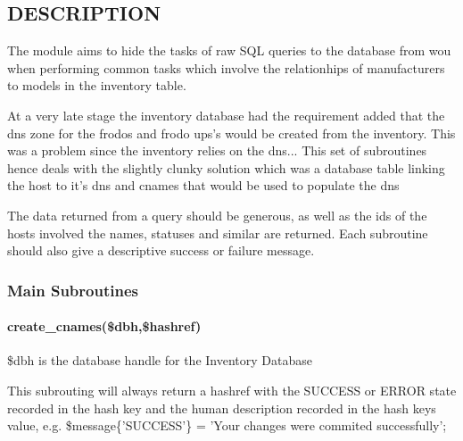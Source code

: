 \documentclass{book}
\begin{document}
\subsection{DESCRIPTION}
\label{Inventory::Cnames_DESCRIPTION}
\hypertarget{Inventory::Cnames_DESCRIPTION}{}



The module aims to hide the tasks of raw SQL queries to the database from wou when performing common tasks which involve the relationhips of manufacturers to models in the inventory table.



At a very late stage the inventory database had the requirement added that the dns zone for the frodos and frodo ups's would be created from the inventory. This was a problem since the inventory relies on the dns... This set of subroutines hence deals with the slightly clunky solution which was a database table linking the host to it's dns and cnames that would be used to populate the dns



The data returned from a query should be generous, as well as the ids of the hosts involved the names, statuses and similar are returned. Each subroutine should also give a descriptive success or failure message.


\subsubsection{Main Subroutines}
\label{Inventory::Cnames_Main_Subroutines}
\hypertarget{Inventory::Cnames_Main_Subroutines}{}


\paragraph*{create\protect\_cnames(\$dbh,\$hashref)}
\label{Inventory::Cnames_create_cnames_dbh_hashref_}
\hypertarget{Inventory::Cnames_create_cnames_dbh_hashref_}{}



\$dbh is the database handle for the Inventory Database



This subrouting will always return a hashref with the SUCCESS or ERROR state recorded in the hash key and the human description recorded in the hash keys value, e.g. \$message\{'SUCCESS'\} = 'Your changes were commited successfully';
\end{document}
